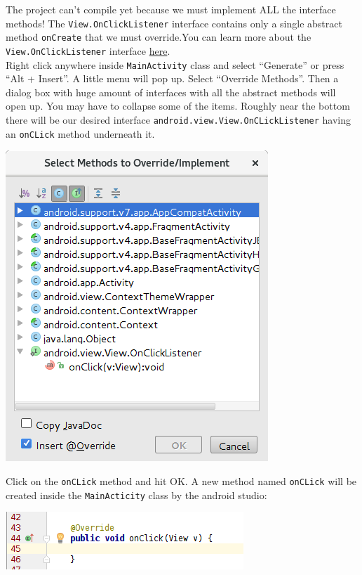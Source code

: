 The project can't compile yet because we must implement ALL the interface methods! The \texttt{View.OnClickListener} interface contains only a single abstract method \texttt{onCreate} that we must override.You can learn more about the \texttt{View.OnClickListener} interface \href{http://developer.android.com/reference/android/view/View.OnClickListener.html}{here}.\\

Right click anywhere inside \texttt{MainActivity} class and select ``Generate'' or press ``Alt + Insert''. A little menu will pop up. Select ``Override Methods''. Then a dialog box with huge amount of interfaces with all the abstract methods will open up. You may have to collapse some of the items. Roughly near the bottom there will be our desired interface \texttt{android.view.View.OnCLickListener} having an \texttt{onCLick} method underneath it. 

\begin{center}
	\includegraphics[scale=0.4]{chapters/ch05/images/10}
\end{center}

Click on the \texttt{onCLick} method and hit OK. A new method named \texttt{onCLick} will be created inside the \texttt{MainActicity} class by the android studio:

\begin{center}
	\includegraphics[scale=0.4]{chapters/ch05/images/11}
\end{center}

